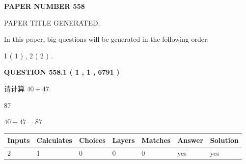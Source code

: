 \documentclass{ctexart}
\begin{document}
   
 {\textbf{ \Large{ PAPER NUMBER  558  }}}
   
   
\vspace{0.2in}
   
   
   
   
   
   
   
   
 \vspace{0.2in}
 
 
 
 
   
   
 PAPER TITLE GENERATED.
   
   
   
\vspace{0.2in}
   
In this paper, big questions will be generated in the following order: 
   
   
   1 ( 1 )
 ,
   2 ( 2 )
 .
  
\vspace{0.2in}
  
{\textbf{\Large{QUESTION
558.1 
 ( 1 , 1 , 6791 )
}}}
  
  
 
请计算 $ %
40 +  %
47 $.
 
 
 
\noindent{}
 
 

87
 
 
\noindent{}
 
 

 
 
 
\noindent{}
 
 

$ %
40 +  %
47=   %
87$
 
 
\noindent{}
 
 

 
   
   
   
   
\noindent\begin{tabular}{|l|l|l|l|l|l|l|}
 \hline
Inputs & Calculates & Choices & Layers & Matches & Answer & Solution \\ \hline
 2  & 
 1  & 
 0
  & 
 0  & 
 0  & 
  yes & 
  yes 
  \\ \hline
 \end{tabular}
   
\end{document}
